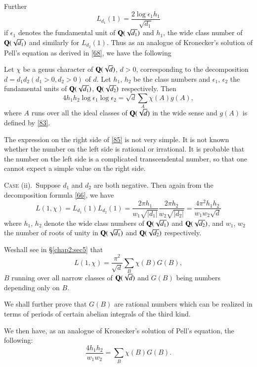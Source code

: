 Further
$$
L_{d_{1}}(1)=\frac{2\log \epsilon_{1}h_{1}}{\sqrt{d_{1}}}
$$
if $\epsilon_{1}$ denotes the fundamental unit of $\mathbf{Q}(\sqrt{d_{1}})$
and $h_{1}$, the wide class number of $\mathbf{Q}(\sqrt{d_{1}})$ and
similarly for $L_{d_{2}}(1)$. Thus as an analogue of Kronecker's
solution of Pell's equation as derived in \eqref{68}, we have the
following

\begin{proposition}\label{prop13}
Let $\chi$ be a genus character of $\mathbf{Q}(\sqrt{d})$, $d>0$,
corresponding to the decomposition $d=d_{1}d_{2}(d_{1}>0,d_{2}>0)$ of
$d$. Let $h_{1}$, $h_{2}$ be the class numbers and $\epsilon_{1}$,
$\epsilon_{2}$ the fundamental units of $\mathbf{Q}(\sqrt{d_{1}})$,
$\mathbf{Q}(\sqrt{d_{2}})$ respectively. Then
\begin{equation*}
4h_{1}h_{2}\log \epsilon_{1}\log
\epsilon_{2}=\sqrt{d}\sum_{A}\chi(A)g(A),\tag{85}\label{85} 
\end{equation*}
where $A$ runs over all the ideal classes of $\mathbf{Q}(\sqrt{d})$ in the
wide sense and $g(A)$ is defined by \eqref{83}.
\end{proposition}

The expression on the right side of \eqref{85} is not very simple. It
is not known whether the number on the left side is rational or
irrational. It is probable that the number on the left side is a
complicated transcendental number, so that one cannot expect a simple
value on the right side.

\textsc{Case} (ii).~Suppose $d_{1}$ and $d_{2}$ are both
negative. Then again from the decomposition formula \eqref{66}, we
have
$$
L(1,\chi)=L_{d_{1}}(1)L_{d_{2}}(1)=\frac{2\pi
  h_{1}}{w_{1}\sqrt{|d_{1}|}}\frac{2\pi h_{2}}{w_{2}\sqrt{|d_{2}|}}=\frac{4\pi^{2}h_{1}h_{2}}{w_{1}w_{2}\sqrt{d}}
$$
where $h_{1}$, $h_{2}$ denote the wide class numbers of
$\mathbf{Q}(\sqrt{d_{1}})$ and $\mathbf{Q}(\sqrt{d_{2}})$, and $w_{1}$, $w_{2}$ the
number of roots of unity in $\mathbf{Q}(\sqrt{d_{1}})$ and
$\mathbf{Q}(\sqrt{d_{2}})$ respectively. 

We\pageoriginale shall see in \S \ref{chap2:sec5} that
$$
L(1,\chi)=\frac{\pi^{2}}{\sqrt{d}}\sum_{B}\chi(B)G(B),
$$
$B$ running over all narrow classes of $\mathbf{Q}(\sqrt{d})$ and $G(B)$
being numbers depending only on $B$.

We shall further prove that $G(B)$ are rational numbers which can be
realized in terms of periods of certain abelian integrals of the third
kind.

We then have, as an analogue of Kronecker's solution of Pell's
equation, the following:
$$
\frac{4h_{1}h_{2}}{w_{1}w_{2}}=\sum_{B}\chi(B)G(B).
$$

